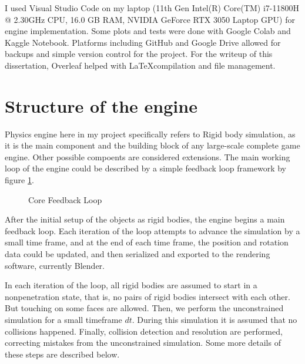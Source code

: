 \documentclass[12pt,a4paper,twoside,openright]{report}
\begin{document}
I used Visual Studio Code on my laptop (11th Gen Intel(R) Core(TM) i7-11800H @ 2.30GHz CPU, 16.0 GB RAM, NVIDIA GeForce RTX 3050 Laptop GPU) for engine implementation. Some plots and tests were done with Google Colab and Kaggle Notebook. Platforms including GitHub and Google Drive allowed for backups and simple version control for the project. For the writeup of this dissertation, Overleaf helped with \LaTeX compilation and file management.

\section{Structure of the engine}

Physics engine here in my project specifically refers to Rigid body simulation, as it is the main component and the building block of any large-scale complete game engine. Other possible compoents are considered extensions. The main working loop of the engine could be described by a simple feedback loop framework by figure \ref{looplbl}.
\begin{figure}\label{looplbl}
    \centering
{}
\caption{Core Feedback Loop}
\end{figure}

After the initial setup of the objects as rigid bodies, the engine begins a main feedback loop. Each iteration of the loop attempts to advance the simulation by a small time frame, and at the end of each time frame, the position and rotation data could be updated, and then serialized and exported to the rendering software, currently Blender.

In each iteration of the loop, all rigid bodies are assumed to start in a nonpenetration state, that is, no pairs of rigid bodies intersect with each other. But touching on some faces are allowed. Then, we perform the unconstrained simulation for a small timeframe $dt$. During this simulation it is assumed that no collisions happened. Finally, collision detection and resolution are performed, correcting mistakes from the unconstrained simulation. Some more details of these steps are described below.
\end{document}
